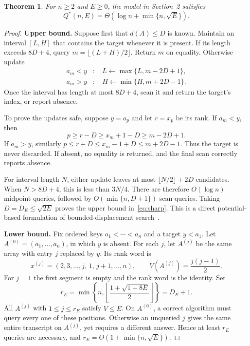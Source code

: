 \documentclass[10pt,letterpaper]{article}
\newtheorem{theorem}{Theorem}
\begin{document}
\begin{theorem}\label{thm:sharp}
For $n\geq2$ and $E\geq0$, the model in Section~2 satisfies
\begin{equation}
 \boxed{Q^*(n,E)=\Theta\!\left(\log n+\min\{n,\sqrt E\}\right).}
 \label{eq:sharp}
\end{equation}
\end{theorem}
\begin{proof}
\textbf{Upper bound.} Suppose first that $d(A)\leq D$ is known. Maintain an interval
$[L,H]$ that contains the target whenever it is present. If its length exceeds
$8D+4$, query $m=\lfloor(L+H)/2\rfloor$. Return $m$ on equality. Otherwise update
\begin{equation}
\begin{aligned}
 a_m<y &: \quad L\leftarrow\max\{L,m-2D+1\},\\
 a_m>y &: \quad H\leftarrow\min\{H,m+2D-1\}.
\end{aligned} \label{eq:updates}
\end{equation}
Once the interval has length at most $8D+4$, scan it and return the target's index,
or report absence.

To prove the updates safe, suppose $y=a_p$ and let $r=x_p$ be its rank.
If $a_m<y$, then
\begin{equation}
 p\geq r-D\geq x_m+1-D\geq m-2D+1.
 \label{eq:saferight}
\end{equation}
If $a_m>y$, similarly $p\leq r+D\leq x_m-1+D\leq m+2D-1$.
Thus the target is never discarded. If absent, no equality is returned, and the final
scan correctly reports absence.

For interval length $N$, either update leaves at most
$\lfloor N/2\rfloor+2D$ candidates. When $N>8D+4$, this is less than $3N/4$.
There are therefore $O(\log n)$ midpoint queries, followed by
$O(\min\{n,D+1\})$ scan queries. Taking $D=D_E\leq\sqrt{2E}$ proves the upper
bound in~\eqref{eq:sharp}. This is a direct potential-based formulation of
bounded-displacement search~\cite{disser}.

\textbf{Lower bound.} Fix ordered keys $a_1<\cdots<a_n$ and a target $y<a_1$.
Let $A^{(0)}=(a_1,\ldots,a_n)$, in which $y$ is absent. For each $j$, let $A^{(j)}$
be the same array with entry $j$ replaced by $y$. Its rank word is
\begin{equation}
 x^{(j)}=(2,3,\ldots,j,\,1,\,j+1,\ldots,n),
 \qquad V(A^{(j)})=\frac{j(j-1)}2. \label{eq:hidden}
\end{equation}
For $j=1$ the first segment is empty and the rank word is the identity. Set
\begin{equation}
 r_E=\min\left\{n,\left\lfloor\frac{1+\sqrt{1+8E}}2\right\rfloor\right\}=D_E+1.
 \label{eq:rE}
\end{equation}
All $A^{(j)}$ with $1\leq j\leq r_E$ satisfy $V\leq E$. On $A^{(0)}$, a correct
algorithm must query every one of these positions. Otherwise an unqueried $j$ gives
the same entire transcript on $A^{(j)}$, yet requires a different answer. Hence at
least $r_E$ queries are necessary, and $r_E=\Theta(1+\min\{n,\sqrt E\})$.


\end{proof}
\end{document}
